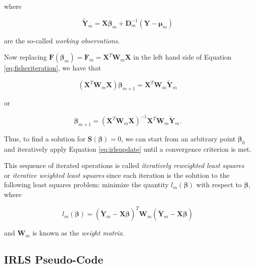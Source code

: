 \documentclass[
  12pt,
]{book}
\begin{document}
where

\begin{equation}
  \boldsymbol{\tilde{Y}}_{m}
  = \boldsymbol{X}\boldsymbol{\beta}_{m} + \boldsymbol{D}_{m}^{-1}(\boldsymbol{Y} - \boldsymbol{\mu}_{m})
\end{equation}

are the so-called \emph{working observations}.

Now replacing \(\boldsymbol{F}(\boldsymbol{\beta}_{m}) = \boldsymbol{F}_{m} = \boldsymbol{X}^{T}\boldsymbol{W}_{m}\boldsymbol{X}\) in the left hand side of Equation \eqref{eq:fisheriteration}, we have that

\begin{equation}
  (\boldsymbol{X}^{T}\boldsymbol{W}_{m}\boldsymbol{X}) \boldsymbol{\beta}_{m+1} = \boldsymbol{X}^{T}\boldsymbol{W}_{m}\boldsymbol{\tilde{Y}}_{m}
\end{equation}

or

\begin{equation}
  \boldsymbol{\beta}_{m+1} = (\boldsymbol{X}^{T}\boldsymbol{W}_{m}\boldsymbol{X})^{-1}\boldsymbol{X}^{T}\boldsymbol{W}_{m}\boldsymbol{\tilde{Y}}_{m}.
  \label{eq:irlsupdate}
\end{equation}

Thus, to find a solution for \(\boldsymbol{S}(\boldsymbol{\beta}) = 0\), we can start from an arbitrary point \(\boldsymbol{\beta}_{0}\) and iteratively apply Equation \eqref{eq:irlsupdate} until a convergence criterion is met.

This sequence of iterated operations is called \emph{iteratively reweighted least squares} or \emph{iterative weighted least squares} since each iteration is the solution to the following least squares problem: minimize the quantity \(l_{m}(\boldsymbol{\beta})\) with respect to \(\boldsymbol{\beta}\), where

\begin{equation}
  l_{m}(\boldsymbol{\beta})
  = (\boldsymbol{\tilde{Y}}_{m} - \boldsymbol{X}\boldsymbol{\beta})^{T} 
    \boldsymbol{W}_{m}
    (\boldsymbol{\tilde{Y}}_{m} - \boldsymbol{X}\boldsymbol{\beta})
\end{equation}

and \(\boldsymbol{W}_{m}\) is known as the \emph{weight matrix}.

\subsection{IRLS Pseudo-Code}\label{irls-pseudo-code}
\end{document}
